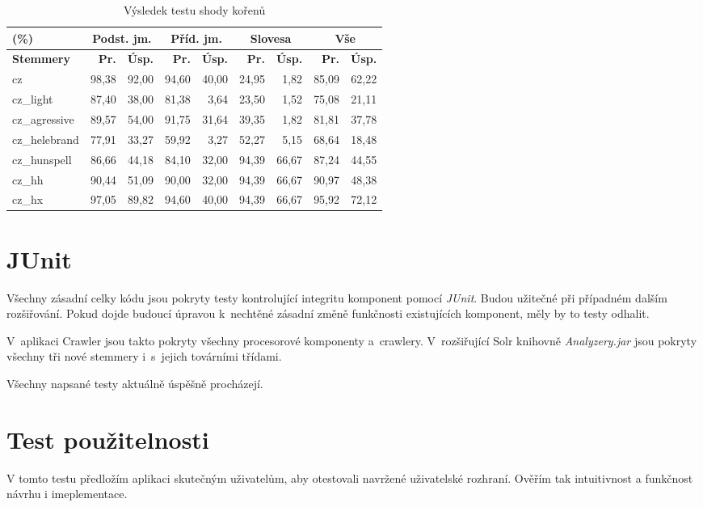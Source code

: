 \begin{table}
\begin{center}
\begin{tabular}{|l|r|r|r|r|r|r|r|r|}
\hline
(\%) & \multicolumn{2}{|c|}{\textbf{Podst. jm.}} & \multicolumn{2}{|c|}{\textbf{Příd. jm.}} & \multicolumn{2}{|c|}{\textbf{Slovesa}} & \multicolumn{2}{|c|}{\textbf{Vše}} \\ \hline
\textbf{Stemmery} & \textbf{Pr.} & \textbf{Úsp.} & \textbf{Pr.} & \textbf{Úsp.} & \textbf{Pr.} & \textbf{Úsp.} & \textbf{Pr.} & \textbf{Úsp.} \\ \hline
cz & 98,38 & 92,00 & 94,60 & 40,00 & 24,95 & 1,82 & 85,09 & 62,22 \\ \hline
cz\_light & 87,40 & 38,00 & 81,38 & 3,64 & 23,50 & 1,52 & 75,08 & 21,11 \\ \hline
cz\_agressive & 89,57 & 54,00 & 91,75 & 31,64 & 39,35 & 1,82 & 81,81 & 37,78 \\ \hline
cz\_helebrand & 77,91 & 33,27 & 59,92 & 3,27 & 52,27 & 5,15 & 68,64 & 18,48 \\ \hline
cz\_hunspell & 86,66 & 44,18 & 84,10 & 32,00 & 94,39 & 66,67 & 87,24 & 44,55 \\ \hline
\hline
cz\_hh & 90,44 & 51,09 & 90,00 & 32,00 & 94,39 & 66,67 & 90,97 & 48,38 \\ \hline
cz\_hx & 97,05 & 89,82 & 94,60 & 40,00 & 94,39 & 66,67 & 95,92 & 72,12 \\ \hline
\end{tabular}
\end{center}
\caption{Výsledek testu shody kořenů}
\label{tab:test_eql}
\end{table}

\section{JUnit}
Všechny zásadní celky kódu jsou pokryty testy kontrolující integritu komponent pomocí \emph{JUnit}. Budou užitečné při případném dalším rozšiřování. Pokud dojde budoucí úpravou k~nechtěné zásadní změně funkčnosti existujících komponent, měly by to testy odhalit.

V~aplikaci Crawler jsou takto pokryty všechny procesorové komponenty a~crawlery. V~rozšiřující Solr knihovně \emph{Analyzery.jar} jsou pokryty všechny tři nové stemmery i~s~jejich továrními třídami.

Všechny napsané testy aktuálně úspěšně procházejí.

\section{Test použitelnosti}
V tomto testu předložím aplikaci skutečným uživatelům, aby otestovali navržené uživatelské rozhraní. Ověřím tak intuitivnost a funkčnost návrhu i imeplementace.

